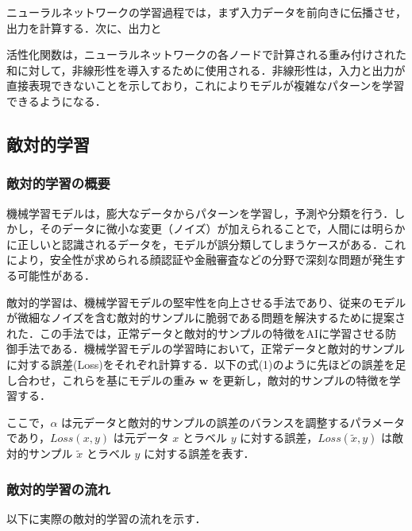 ニューラルネットワークの学習過程では，まず入力データを前向きに伝播させ，出力を計算する．次に、出力と

活性化関数は，ニューラルネットワークの各ノードで計算される重み付けされた和に対して，非線形性を導入するために使用される．非線形性は，入力と出力が直接表現できないことを示しており，これによりモデルが複雑なパターンを学習できるようになる．\cite{kikagaku-NN}

\subsection{敵対的学習}
\subsubsection{敵対的学習の概要}
機械学習モデルは，膨大なデータからパターンを学習し，予測や分類を行う．しかし，そのデータに微小な変更（ノイズ）が加えられることで，人間には明らかに正しいと認識されるデータを，モデルが誤分類してしまうケースがある．これにより，安全性が求められる顔認証や金融審査などの分野で深刻な問題が発生する可能性がある．

敵対的学習は、機械学習モデルの堅牢性を向上させる手法であり、従来のモデルが微細なノイズを含む敵対的サンプルに脆弱である問題を解決するために提案された\cite{goodfellow2015explaining}．この手法では，正常データと敵対的サンプルの特徴をAIに学習させる防御手法である．機械学習モデルの学習時において，正常データと敵対的サンプルに対する誤差(Loss)をそれぞれ計算する．以下の式(1)のように先ほどの誤差を足し合わせ，これらを基にモデルの重み $\bm{w}$ を更新し，敵対的サンプルの特徴を学習する．


ここで，$\alpha$ は元データと敵対的サンプルの誤差のバランスを調整するパラメータであり，$Loss(x,y)$ は元データ $x$ とラベル $y$ に対する誤差，$Loss(\tilde{x},y)$ は敵対的サンプル $\tilde{x}$ とラベル $y$ に対する誤差を表す．

\subsubsection{敵対的学習の流れ}
以下に実際の敵対的学習の流れを示す．\cite{MBSD-AdversarialTraining}

